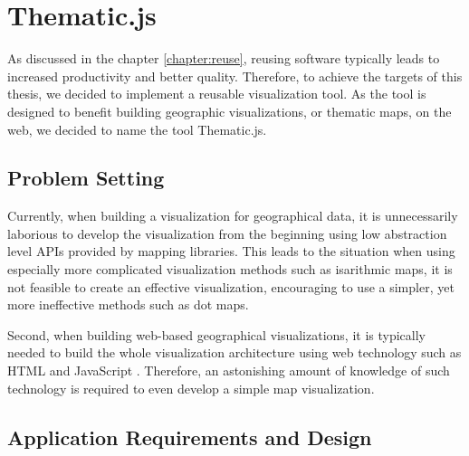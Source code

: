 
\chapter{Thematic.js}
\label{chapter:implementation}




As discussed in the chapter \ref{chapter:reuse}, reusing software typically leads to increased productivity and better quality. Therefore, to achieve the targets of this thesis, we decided to implement a reusable visualization tool. As the tool is designed to benefit building geographic visualizations, or thematic maps, on the web, we decided to name the tool Thematic.js.

\section{Problem Setting}

Currently, when building a visualization for geographical data, it is unnecessarily laborious to develop the visualization from the beginning using low abstraction level APIs provided by mapping libraries. This leads to the situation when using especially more complicated visualization methods such as isarithmic maps, it is not feasible to create an effective visualization, encouraging to use a simpler, yet more ineffective methods such as dot maps.

Second, when building web-based geographical visualizations, it is typically needed to build the whole visualization architecture using web technology such as HTML \citep{world_wide_web_consortium_html5_2014} and JavaScript \citep{ecma_ecmascript_2011}. Therefore, an astonishing amount of knowledge of such technology is required to even develop a simple map visualization. 


\section{Application Requirements and Design}
\label{section:requirements}


